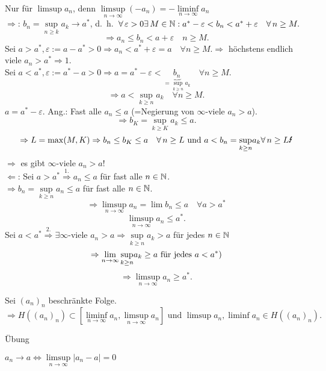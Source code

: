 \documentclass[../ana1.tex]{subfiles}
\begin{document}
\begin{bew}
	Nur für \( \limsup a_n \), denn \( \limsup\limits_{n\rightarrow\infty}(-a_n) = -\liminf\limits_{n\rightarrow\infty} a_n \) \\
	\glqq{}\(\Rightarrow \)\grqq{}: \(b_n = \underset{n\geq k}{\sup}a_k \rightarrow a^* \), d.\ h.\  \(\forall \varepsilon>0\exists M\in\N: a^*-\varepsilon < b_n < a^* + \varepsilon \quad \forall n\geq M. \) \\
	\[ \Rightarrow a_n \leq b_n < a + \varepsilon \quad n\geq M. \]
	Sei \(  a>a^*, \varepsilon := a-a^* >0 \Rightarrow a_n < a^* + \varepsilon = a \quad \forall n\geq M. \Rightarrow \) höchstens endlich viele \( a_n >a^* \Rightarrow 1. \) \\
	Sei \( a< a^*, \varepsilon := a^*-a >0 \Rightarrow a=a^*-\varepsilon < \underbrace{b_n}_{=\underset{k\geq n}{\sup} a_k} \quad \forall n\geq M. \) \\
	\[ \Rightarrow a < \underset{k\geq n}{\sup} a_k \quad \forall n\geq M. \]
	\(a=a^* - \varepsilon \).
	Ang.: Fast alle \(a_n \leq a \) (=Negierung von \( \infty \)-viele \(a_n>a\)).\\
	\[ \Rightarrow b_K = \underset{k\geq K}{\sup} a_k \leq a. \]
	\[ \Rightarrow L = \max(M,K) \Rightarrow b_n \leq b_K \leq a \quad \forall n\geq L \text{ und } a<b_n=\underset{k\geq n}{\sup}a_k \forall n\geq L \text{\Lightning} \]
	\( \Rightarrow \) es gibt \(\infty \)-viele \(a_n>a\)!\\
	\glqq{}\(\Leftarrow \)\grqq{}: Sei \(a>a^* \overset{\text{1.}}{\Rightarrow} a_n \leq a \) für fast alle \(n\in\mathbb{N} \). \\
	\( \Rightarrow b_n = \underset{k\geq n}{\sup} a_n \leq a \) für fast alle \(n\in\mathbb{N} \). \\
	\[ \Rightarrow \limsup\limits_{n\rightarrow\infty} a_n = \lim b_n \leq a \quad \forall a> a^* \]
	\[ \limsup\limits_{n\rightarrow\infty} a_n \leq a^*. \]
	Sei \(a<a^* \overset{\text{2.}}{\Rightarrow} \exists \infty \)-viele \(a_n > a \Rightarrow \underset{k\geq n}{\sup} a_k > a \) für jedes \(n\in\mathbb{N} \) 
	\[ \Rightarrow \lim\limits_{n\rightarrow\infty}\underset{k\geq n}{\sup}a_k \geq a \text{ für jedes }a<a^*) \]
	\[ \Rightarrow \limsup\limits_{n\rightarrow\infty} a_n\geq a^*. \]
\end{bew}
\begin{kor}
	Sei \({(a_n)}_n\) beschränkte Folge.
	\[ \Rightarrow H({(a_n)}_n) \subset [ \liminf\limits_{n\rightarrow\infty}a_n, \limsup\limits_{n\rightarrow\infty}a_n ] \text{ und } \limsup a_n, \liminf a_n \in H({(a_n)}_n). \]
\end{kor}
\begin{bew}
	Übung
\end{bew}
\(a_n \rightarrow a \Leftrightarrow \limsup\limits_{n\rightarrow\infty}|a_n - a| = 0 \)
\end{document}

